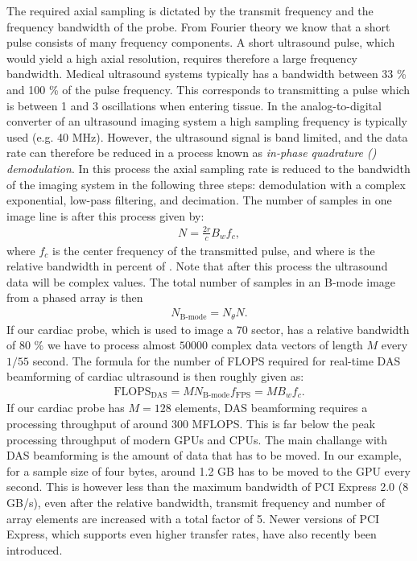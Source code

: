 The required axial sampling is dictated by the transmit frequency and the frequency bandwidth of the probe. From Fourier theory we know that a short pulse consists of many frequency components. A short ultrasound pulse, which would yield a high axial resolution, requires therefore a large frequency bandwidth. Medical ultrasound systems typically has a bandwidth between 33 \% and 100 \% of the pulse frequency. This corresponds to transmitting a pulse which is between 1 and 3 oscillations when entering tissue. In the analog-to-digital converter of an ultrasound imaging system a high sampling frequency is typically used (e.g. 40 MHz). However, the ultrasound signal is band limited, and the data rate can therefore be reduced in a process known as \textit{in-phase quadrature () demodulation}. In this process the axial sampling rate is reduced to the bandwidth of the imaging system in the following three steps: demodulation with a complex exponential, low-pass filtering, and decimation. The number of samples in one image line is after this process given by:
\begin{align}
N = \frac{2r}{c}B_wf_c,
\end{align}
where $f_c$ is the center frequency of the transmitted pulse, and where  is the relative bandwidth in percent of . Note that after this process the ultrasound data will be complex values. The total number of samples in an B-mode image from a phased array is then 
\begin{align}
N_{\text{B-mode}} = N_\theta N.
\end{align}
If our cardiac probe, which is used to image a $70$\degree{} sector, has a relative bandwidth of $80$ \% we have to process almost $50000$ complex data vectors of length $M$ every $1/55$ second. The formula for the number of FLOPS required for real-time DAS beamforming of cardiac ultrasound is then roughly given as:
\begin{align}
\text{FLOPS}_{\text{DAS}} = MN_{\text{B-mode}}f_{\text{FPS}} = MB_wf_c.
\end{align}
If our cardiac probe has $M=128$ elements, DAS beamforming requires a processing throughput of around $300$ MFLOPS. This is far below the peak processing throughput of modern GPUs and CPUs. The main challange with DAS beamforming is the amount of data that has to be moved. In our example, for a sample size of four bytes, around 1.2 GB has to be moved to the GPU every second. This is however less than the maximum bandwidth of PCI Express 2.0 (8 GB/s), even after the relative bandwidth, transmit frequency and number of array elements are increased with a total factor of 5. Newer versions of PCI Express, which supports even higher transfer rates, have also recently been introduced.


